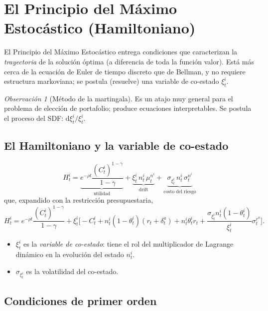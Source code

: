 \documentclass[11pt]{article}
\theoremstyle{definition}
\theoremstyle{remark}
\newtheorem*{obs}{Observación}
\newcommand{\dd}{\mathrm{d}}
\begin{document}
\section{El Principio del Máximo Estocástico (Hamiltoniano)}

El Principio del Máximo Estocástico entrega condiciones que caracterizan la \emph{trayectoria} de la solución óptima (a diferencia de toda la función valor). Está más cerca de la ecuación de Euler de tiempo discreto que de Bellman, y no requiere estructura markoviana; se postula (resuelve) una variable de co-estado $\xi_t^{i}$.

\begin{obs}[Método de la martingala]
Es un atajo muy general para el problema de elección de portafolio; produce ecuaciones interpretables. Se postula el proceso del SDF: $\dd\xi_t^{i}/\xi_t^{i}$.
\end{obs}

\subsection{El Hamiltoniano y la variable de co-estado}

\begin{equation}
H_t^{i}=\underbrace{e^{-\rho t}\frac{(C_t^{i})^{1-\gamma}}{1-\gamma}}_{\text{utilidad}}
+\underbrace{\xi_t^{i}\,n_t^{i}\,\mu_t^{n^{i}}}_{\text{drift}}
+\underbrace{\sigma_{\xi_t^{i}}\,n_t^{i}\,\sigma_t^{n^{i}}}_{\text{costo del riesgo}}
\end{equation}
que, expandido con la restricción presupuestaria,
\[
H_t^{i}=e^{-\rho t}\frac{(C_t^{i})^{1-\gamma}}{1-\gamma}
+\xi_t^{i}\Big[-C_t^{i}+n_t^{i}(1-\theta_t^{i})(r_t+\delta_t^{a})+n_t^{i}\theta_t^{i}r_t
+\frac{\sigma_{\xi_t^{i}}n_t^{i}(1-\theta_t^{i})}{\xi_t^{i}}\sigma_t^{r^{a}}\Big].
\]

\begin{itemize}[leftmargin=2.2em]
\item $\xi_t^{i}$ es la \emph{variable de co-estado}: tiene el rol del multiplicador de Lagrange dinámico en la evolución del estado $n_t^{i}$.
\item $\sigma_{\xi_t^{i}}$ es la volatilidad del co-estado.
\end{itemize}

\subsection{Condiciones de primer orden}
\end{document}

